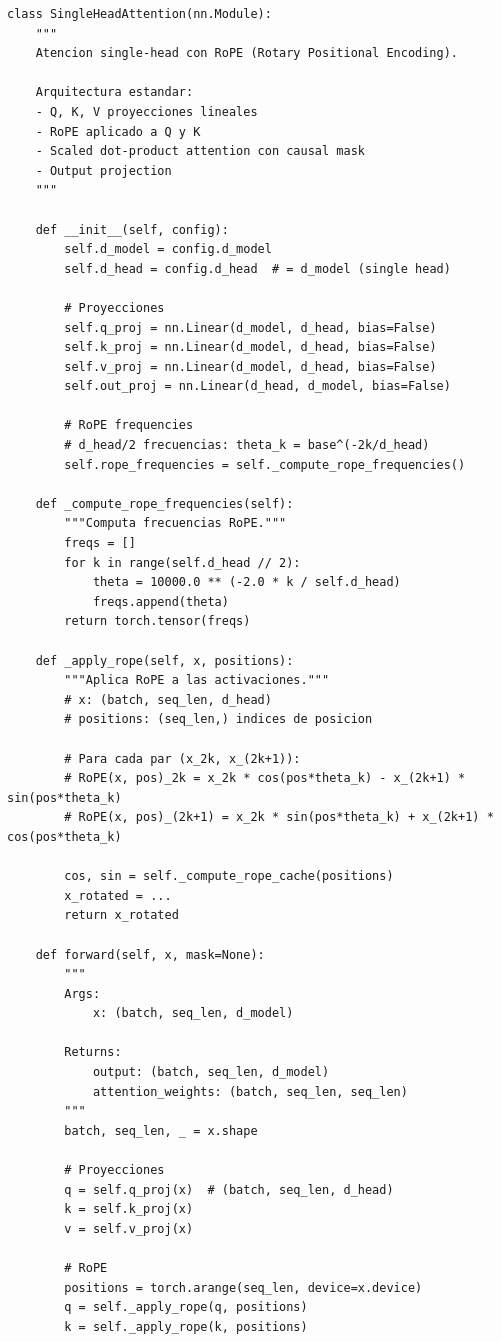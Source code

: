 \documentclass[12pt,a4paper]{report}
\begin{document}
\begin{lstlisting}
class SingleHeadAttention(nn.Module):
    """
    Atencion single-head con RoPE (Rotary Positional Encoding).
    
    Arquitectura estandar:
    - Q, K, V proyecciones lineales
    - RoPE aplicado a Q y K
    - Scaled dot-product attention con causal mask
    - Output projection
    """
    
    def __init__(self, config):
        self.d_model = config.d_model
        self.d_head = config.d_head  # = d_model (single head)

        # Proyecciones
        self.q_proj = nn.Linear(d_model, d_head, bias=False)
        self.k_proj = nn.Linear(d_model, d_head, bias=False)
        self.v_proj = nn.Linear(d_model, d_head, bias=False)
        self.out_proj = nn.Linear(d_head, d_model, bias=False)

        # RoPE frequencies
        # d_head/2 frecuencias: theta_k = base^(-2k/d_head)
        self.rope_frequencies = self._compute_rope_frequencies()
    
    def _compute_rope_frequencies(self):
        """Computa frecuencias RoPE."""
        freqs = []
        for k in range(self.d_head // 2):
            theta = 10000.0 ** (-2.0 * k / self.d_head)
            freqs.append(theta)
        return torch.tensor(freqs)
    
    def _apply_rope(self, x, positions):
        """Aplica RoPE a las activaciones."""
        # x: (batch, seq_len, d_head)
        # positions: (seq_len,) indices de posicion

        # Para cada par (x_2k, x_(2k+1)):
        # RoPE(x, pos)_2k = x_2k * cos(pos*theta_k) - x_(2k+1) * sin(pos*theta_k)
        # RoPE(x, pos)_(2k+1) = x_2k * sin(pos*theta_k) + x_(2k+1) * cos(pos*theta_k)

        cos, sin = self._compute_rope_cache(positions)
        x_rotated = ...
        return x_rotated
    
    def forward(self, x, mask=None):
        """
        Args:
            x: (batch, seq_len, d_model)
        
        Returns:
            output: (batch, seq_len, d_model)
            attention_weights: (batch, seq_len, seq_len)
        """
        batch, seq_len, _ = x.shape

        # Proyecciones
        q = self.q_proj(x)  # (batch, seq_len, d_head)
        k = self.k_proj(x)
        v = self.v_proj(x)

        # RoPE
        positions = torch.arange(seq_len, device=x.device)
        q = self._apply_rope(q, positions)
        k = self._apply_rope(k, positions)


\end{lstlisting}
\end{document}
